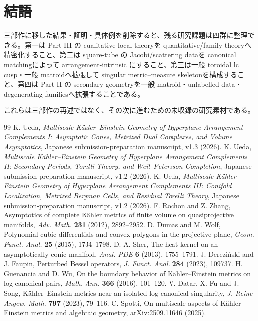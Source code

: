 \documentclass[11pt,a4paper]{ltjsarticle}
\theoremstyle{plain}
\theoremstyle{definition}
\theoremstyle{remark}
\begin{document}
\section{結語}

三部作に移した結果・証明・具体例を削除すると、残る研究課題は四群に整理できる。第一は Part III の qualitative local theoryを quantitative/family theoryへ精密化すること、第二は square-tube の Jacobi/scattering dataを canonical matchingによって arrangement-intrinsic にすること、第三は一般 toroidal lc cusp・一般 matroidへ拡張して singular metric--measure skeletonを構成すること、第四は Part II の secondary geometryを一般 matroid・unlabelled data・degenerating familiesへ拡張することである。

これらは三部作の再述ではなく、その次に進むための未収録の研究素材である。

\small
\begin{thebibliography}{99}\footnotesize
{} K. Ueda, \emph{Multiscale K\"ahler--Einstein Geometry of Hyperplane Arrangement Complements I: Asymptotic Cones, Metrized Dual Complexes, and Volume Asymptotics}, Japanese submission-preparation manuscript, v1.3 (2026).
 K. Ueda, \emph{Multiscale K\"ahler--Einstein Geometry of Hyperplane Arrangement Complements II: Secondary Periods, Torelli Theory, and Weil--Petersson Completion}, Japanese submission-preparation manuscript, v1.2 (2026).
 K. Ueda, \emph{Multiscale K\"ahler--Einstein Geometry of Hyperplane Arrangement Complements III: Conifold Localization, Metrized Bergman Cells, and Residual Torelli Theory}, Japanese submission-preparation manuscript, v1.2 (2026).
 F. Rochon and Z. Zhang, Asymptotics of complete K\"ahler metrics of finite volume on quasiprojective manifolds, \emph{Adv. Math.} \textbf{231} (2012), 2892--2952.
 D. Dumas and M. Wolf, Polynomial cubic differentials and convex polygons in the projective plane, \emph{Geom. Funct. Anal.} \textbf{25} (2015), 1734--1798.
 D. A. Sher, The heat kernel on an asymptotically conic manifold, \emph{Anal. PDE} \textbf{6} (2013), 1755--1791.
 J. Derezi\'nski and J. Faupin, Perturbed Bessel operators, \emph{J. Funct. Anal.} \textbf{284} (2023), 109737.
 H. Guenancia and D. Wu, On the boundary behavior of K\"ahler--Einstein metrics on log canonical pairs, \emph{Math. Ann.} \textbf{366} (2016), 101--120.
 V. Datar, X. Fu and J. Song, K\"ahler--Einstein metrics near an isolated log-canonical singularity, \emph{J. Reine Angew. Math.} \textbf{797} (2023), 79--116.
 C. Spotti, On multiscale aspects of K\"ahler--Einstein metrics and algebraic geometry, arXiv:2509.11646 (2025).
\end{thebibliography}
\end{document}
